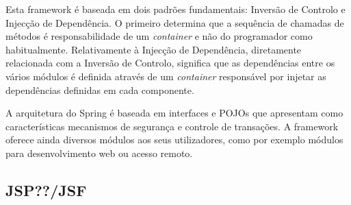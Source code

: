 Esta framework é baseada em dois padrões fundamentais: Inversão de Controlo e Injecção de Dependência. O primeiro determina que a sequência de chamadas de métodos é responsabilidade de um \textit{container} e não do programador como habitualmente. Relativamente à Injecção de Dependência, diretamente relacionada com a Inversão de Controlo, significa que as dependências entre os vários módulos é definida através de um \textit{container} responsável por injetar as dependências definidas em cada componente.

A arquitetura do Spring é baseada em interfaces e POJOs que apresentam como características mecanismos de segurança e controle de transações. A framework oferece ainda diversos módulos aos seus utilizadores, como por exemplo módulos para desenvolvimento web ou acesso remoto.

\subsection{JSP??/JSF}
 